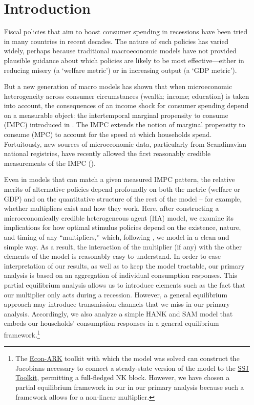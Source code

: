\documentclass[\econtexRoot/HAFiscal]{subfiles}
\begin{document}
\hypertarget{introduction}{}\par\section{Introduction}\notinsubfile{\label{sec:intro}}
\setcounter{page}{0}

Fiscal policies that aim to boost consumer spending in recessions have been tried in many countries in recent decades.  The nature of such policies has varied widely, perhaps because traditional macroeconomic models have not provided plausible guidance about which policies are likely to be most effective---either in reducing misery (a `welfare metric') or in increasing output (a `GDP metric').

But a new generation of macro models has shown that when microeconomic heterogeneity across consumer circumstances (wealth; income; education) is taken into account, the consequences of an income shock for consumer spending depend on a measurable object: the intertemporal marginal propensity to consume (IMPC) introduced in \cite{auclert2018IKC}.  The IMPC extends the notion of marginal propensity to consume (MPC) to account for the speed at which households spend.  Fortuitously, new sources of microeconomic data, particularly from Scandinavian national registries, have recently allowed the first reasonably credible measurements of the IMPC (\cite{fagereng_mpc_2021}).

Even in models that can match a given measured IMPC pattern, the relative merits of alternative policies depend profoundly on both the metric (welfare or GDP) and on the quantitative structure of the rest of the model -- for example, whether multipliers exist and how they work. Here, after constructing a microeconomically credible heterogeneous agent (HA) model, we examine its implications for how optimal stimulus policies depend on the existence, nature, and timing of any ``multipliers,'' which, following \cite{kmpHandbook2016}, we model in a clean and simple way.  As a result, the interaction of the multiplier (if any) with the other elements of the model is reasonably easy to understand. In order to ease interpretation of our results, as well as to keep the model tractable, our primary analysis is based on an aggregation of individual consumption responses. This partial equilibrium analysis allows us to introduce elements such as the fact that our multiplier only acts during a recession. However, a general equilibrium approach may introduce transmission channels that we miss in our primary analysis. Accordingly, we also analyze a simple HANK and SAM model that embeds our households' consumption responses in a general equilibrium framework.\footnote{The \href{https://econ-ark.org}{Econ-ARK} toolkit with which the model was solved can construct the Jacobians necessary to connect a steady-state version of the model to the \href{https://github.com/shade-econ/sequence-jacobian}{SSJ Toolkit}, permitting a full-fledged NK block. However, we have chosen a partial equilibrium framework in our in our primary analysis because such a framework allows for a non-linear multiplier. }
\end{document}
